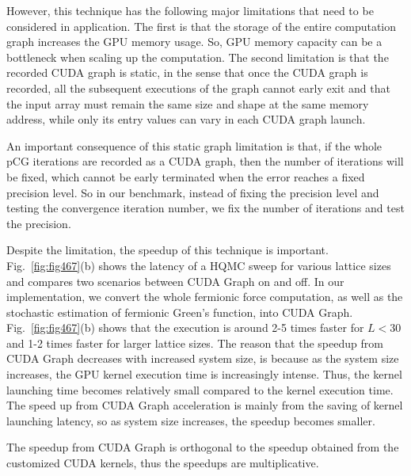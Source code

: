 \documentclass[aps,prl,twocolumn,superscriptaddress,showpacs,longbibliography]{revtex4-2}
\newcommand{\reffg}[1]{\textmd{Fig.\ }\ref{#1}}
\begin{document}
However, this technique has the following major limitations that need to be considered in application. The first is that the storage of the entire computation graph increases the GPU memory usage. So, GPU memory capacity can be a bottleneck when scaling up the computation. The second limitation is that the recorded CUDA graph is static, in the sense that once the CUDA graph is recorded, all the subsequent executions of the graph cannot early exit and that the input array must remain the same size and shape at the same memory address, while only its entry values can vary in each CUDA graph launch.

An important consequence of this static graph limitation is that, if the whole pCG iterations are recorded as a CUDA graph, then the number of iterations will be fixed, which cannot be early terminated when the error reaches a fixed precision level. So in our benchmark, instead of fixing the precision level and testing the convergence iteration number, we fix the number of iterations and test the precision.

Despite the limitation, the speedup of this technique is important. \reffg{fig:fig467}(b) shows the latency of a HQMC sweep for various lattice sizes and compares two scenarios between CUDA Graph on and off. In our implementation, we convert the whole fermionic force computation, as well as the stochastic estimation of fermionic Green's function, into CUDA Graph. 
\reffg{fig:fig467}(b) shows that the execution is around 2-5 times faster for $L<30$ and 1-2 times faster for larger lattice sizes. The reason that the speedup from CUDA Graph decreases with increased system size, is because as the system size increases, the GPU kernel execution time is increasingly intense. Thus, the kernel launching time becomes relatively small compared to the kernel execution time. The speed up from CUDA Graph acceleration is mainly from the saving of kernel launching latency, so as system size increases, the speedup becomes smaller.

The speedup from CUDA Graph is orthogonal to the speedup obtained from the customized CUDA kernels, thus the speedups are multiplicative.

\vspace{3mm} 
\end{document}
